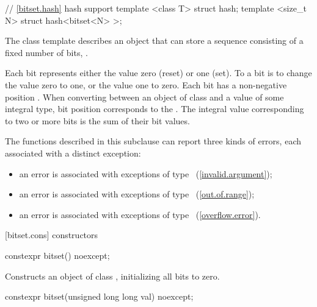 \begin{codeblock}
{  // \ref{bitset.hash} hash support
  template <class T> struct hash;
  template <size_t N> struct hash<bitset<N> >;
}
\end{codeblock}

\pnum
The class template
%
describes an object that can store a sequence consisting of a fixed number of
bits, .

\pnum
Each bit represents either the value zero (reset) or one (set).
To
a bit is to change the value zero to one, or the value one to
zero.
Each bit has a non-negative position .
When converting
between an object of class
and a value of some
integral type, bit position  corresponds to the
.
The integral value corresponding to two
or more bits is the sum of their bit values.

\pnum
The functions described in this subclause can report three kinds of
errors, each associated with a distinct exception:

\begin{itemize}
\item
an
error is associated with exceptions of type
~(\ref{invalid.argument});
%
\item
an
error is associated with exceptions of type
~(\ref{out.of.range});
%
\item
an
error is associated with exceptions of type
~(\ref{overflow.error}).
%
\end{itemize}

[bitset.cons]{ constructors}

%
\begin{itemdecl}
constexpr bitset() noexcept;
\end{itemdecl}

\begin{itemdescr}
\pnum
\effects
Constructs an object of class
,
initializing all bits to zero.
\end{itemdescr}

\begin{itemdecl}
constexpr bitset(unsigned long long val) noexcept;
\end{itemdecl}

